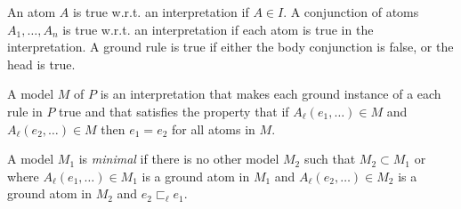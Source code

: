 \documentclass[10pt,twocolumn]{article}
\begin{document}
An atom $A$ is true w.r.t. an interpretation if $A \in I$. 
A conjunction of atoms $A_1, \dots, A_n$ is true w.r.t. an interpretation if each atom is true in the interpretation.
A ground rule is true if either the body conjunction is false, or the head is true.

A model $M$ of $P$ is an interpretation that makes each ground instance of a each rule in $P$ true and that satisfies the property that if $A_\ell(e_1, \dots) \in M$ and $A_\ell(e_2, \dots) \in M$ then $e_1 = e_2$ for all atoms in $M$.

A model $M_1$ is \emph{minimal} if there is no other model $M_2$ such 
that $M_2 \subset M_1$ or where $A_\ell(e_1, \dots) \in M_1$ is a ground atom in $M_1$ 
and $A_\ell(e_2, \dots) \in M_2$ is a ground atom in $M_2$ and $e_2 \sqsubset_\ell e_1$.



\end{document}
